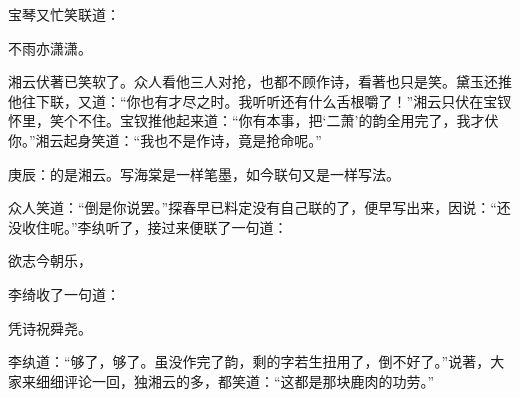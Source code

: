 \begin{parag}
    宝琴又忙笑联道：
\end{parag}
\begin{poem}
    \begin{pl} 不雨亦潇潇。\end{pl}
\end{poem}
\begin{parag}
    湘云伏著已笑软了。众人看他三人对抢，也都不顾作诗，看著也只是笑。黛玉还推他往下联，又道：“你也有才尽之时。我听听还有什么舌根嚼了！”湘云只伏在宝钗怀里，笑个不住。宝钗推他起来道：“你有本事，把‘二萧’的韵全用完了，我才伏你。”湘云起身笑道：“我也不是作诗，竟是抢命呢。”\begin{note}庚辰：的是湘云。写海棠是一样笔墨，如今联句又是一样写法。\end{note}众人笑道：“倒是你说罢。”探春早已料定没有自己联的了，便早写出来，因说：“还没收住呢。”李纨听了，接过来便联了一句道：
\end{parag}
\begin{poem}
    \begin{pl} 欲志今朝乐，\end{pl}
\end{poem}
\begin{parag}
    李绮收了一句道：
\end{parag}
\begin{poem}
    \begin{pl} 凭诗祝舜尧。\end{pl}
\end{poem}
\begin{parag}
    李纨道：“够了，够了。虽没作完了韵，剩的字若生扭用了，倒不好了。”说著，大家来细细评论一回，独湘云的多，都笑道：“这都是那块鹿肉的功劳。”
\end{parag}


